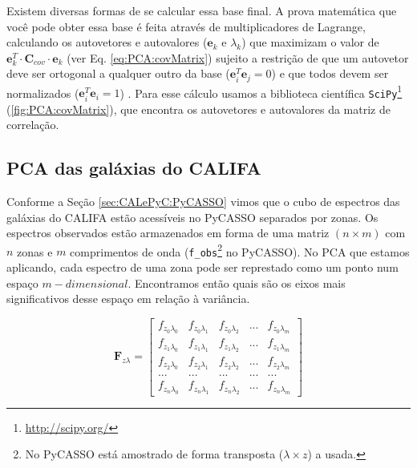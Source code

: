 Existem diversas formas de se calcular essa base final. A prova matemática que
você pode obter essa base é feita através de multiplicadores de Lagrange,
calculando os autovetores e autovalores ($\mathbf{e}{}_k$ e $\lambda_k$) que
maximizam o valor de $\mathbf{e}{}_k^T \cdot \mathbf{C}{}_{cov} \cdot
\mathbf{e}{}_k$ (ver Eq. \ref{eq:PCA:covMatrix}) sujeito a restrição de que um
autovetor deve ser ortogonal a qualquer outro da base ($\mathbf{e}{}_i^T
\mathbf{e}{}_j = 0$) e que todos devem ser normalizados ($\mathbf{e}{}_i^T
\mathbf{e}{}_i = 1$) \citep[][p. 5-6]{JolliffePCA1986}. Para esse cálculo usamos
a biblioteca científica \texttt{SciPy}\footnote{\url{http://scipy.org/}}
(\ref{fig:PCA:covMatrix}), que encontra os autovetores e autovalores da matriz
de correlação.

\subsection{PCA das galáxias do CALIFA}

Conforme a Seção \ref{sec:CALePyC:PyCASSO} vimos que o cubo de espectros das
galáxias do CALIFA estão acessíveis no PyCASSO separados por zonas. Os espectros
observados estão armazenados em forma de uma matriz $(n \times m)$ com $n$ zonas
e $m$ comprimentos de onda (\texttt{f\_obs}\footnote{No PyCASSO está amostrado
de forma transposta ($\lambda \times z$) a usada.} no PyCASSO). No PCA que
estamos aplicando, cada espectro de uma zona pode ser represtado como um ponto
num espaço $m-dimensional$. Encontramos então quais são os eixos mais
significativos desse espaço em relação à variância. 

\begin{equation}
    \label{eq:PCA:fluxMatrix}
    \textbf{F}{}_{z \lambda} = \left[
    \begin{array}{ccccc}
        f_{z_0 \lambda_0} & f_{z_0 \lambda_1} & f_{z_0 \lambda_2} & ... & f_{z_0 \lambda_m} \\
        f_{z_1 \lambda_0} & f_{z_1 \lambda_1} & f_{z_1 \lambda_2} & ... & f_{z_1 \lambda_m} \\
        f_{z_2 \lambda_0} & f_{z_2 \lambda_1} & f_{z_2 \lambda_2} & ... & f_{z_2 \lambda_m} \\
        ...               & ...               & ...               & ... & ...               \\
        f_{z_n \lambda_0} & f_{z_n \lambda_1} & f_{z_n \lambda_2} & ... & f_{z_n \lambda_m} 
    \end{array} 
    \right]
\end{equation}

